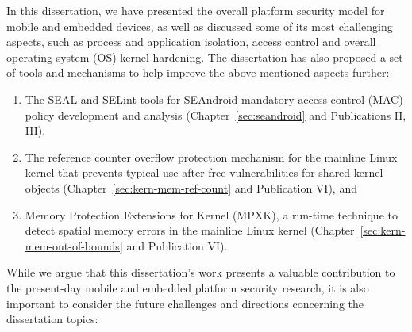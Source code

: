 
In this dissertation, we have presented the overall platform security model for mobile and embedded devices, as well as discussed some of its most challenging aspects, such as process and application isolation, access control and overall operating system (OS) kernel hardening.
The dissertation has also proposed a set of tools and mechanisms to help improve the above-mentioned aspects further: 
\begin{enumerate}
	\item The SEAL and SELint tools for SEAndroid mandatory access control (MAC) policy development and analysis (Chapter~\ref{sec:seandroid} and Publications II, III),
	\item The reference counter overflow protection mechanism for the mainline Linux kernel that prevents typical use-after-free vulnerabilities for shared kernel objects (Chapter~\ref{sec:kern-mem-ref-count} and Publication VI), and
	\item Memory Protection Extensions for Kernel (MPXK), a run-time technique to detect spatial memory errors in the mainline Linux kernel (Chapter~\ref{sec:kern-mem-out-of-bounds} and Publication VI). 
\end{enumerate}

While we argue that this dissertation's work presents a valuable contribution to the present-day mobile and embedded platform security research, it is also important to consider the future challenges and directions concerning the dissertation topics:

